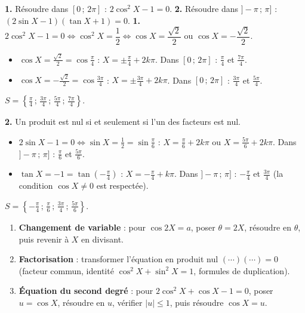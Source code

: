 \documentclass[11pt]{article}
\begin{document}
\begin{exoresolu}
\textbf{1.} Résoudre dans $[0\,;\,2\pi]$ : $2\cos^2 X - 1 = 0$.
\textbf{2.} Résoudre dans $]-\pi\,;\,\pi]$ : $(2\sin X - 1)(\tan X + 1) = 0$.
\tcblower
\textbf{1.} $2\cos^2 X - 1 = 0 \iff \cos^2 X = \dfrac12 \iff \cos X = \dfrac{\sqrt2}{2}$ ou $\cos X = -\dfrac{\sqrt2}{2}$.
\begin{itemize}
\item $\cos X = \frac{\sqrt2}{2} = \cos\frac{\pi}{4}$ : $X = \pm\frac{\pi}{4} + 2k\pi$. Dans $[0\,;\,2\pi]$ : $\frac{\pi}{4}$ et $\frac{7\pi}{4}$.
\item $\cos X = -\frac{\sqrt2}{2} = \cos\frac{3\pi}{4}$ : $X = \pm\frac{3\pi}{4} + 2k\pi$. Dans $[0\,;\,2\pi]$ : $\frac{3\pi}{4}$ et $\frac{5\pi}{4}$.
\end{itemize}
$S = \left\lbrace \frac{\pi}{4}\,;\,\frac{3\pi}{4}\,;\,\frac{5\pi}{4}\,;\,\frac{7\pi}{4} \right\rbrace$.

\textbf{2.} Un produit est nul si et seulement si l'un des facteurs est nul.
\begin{itemize}
\item $2\sin X - 1 = 0 \iff \sin X = \frac12 = \sin\frac{\pi}{6}$ : $X = \frac{\pi}{6} + 2k\pi$ ou $X = \frac{5\pi}{6} + 2k\pi$. Dans $]-\pi\,;\,\pi]$ : $\frac{\pi}{6}$ et $\frac{5\pi}{6}$.
\item $\tan X = -1 = \tan\left(-\frac{\pi}{4}\right)$ : $X = -\frac{\pi}{4} + k\pi$. Dans $]-\pi\,;\,\pi]$ : $-\frac{\pi}{4}$ et $\frac{3\pi}{4}$ (la condition $\cos X \neq 0$ est respectée).
\end{itemize}
$S = \left\lbrace -\frac{\pi}{4}\,;\,\frac{\pi}{6}\,;\,\frac{3\pi}{4}\,;\,\frac{5\pi}{6} \right\rbrace$.
\end{exoresolu}

\begin{methode}
\begin{enumerate}
\item \textbf{Changement de variable} : pour $\cos 2X = a$, poser $\theta = 2X$, résoudre en $\theta$, puis revenir à $X$ en divisant.
\item \textbf{Factorisation} : transformer l'équation en produit nul $(\cdots)(\cdots) = 0$ (facteur commun, identité $\cos^2 X + \sin^2 X = 1$, formules de duplication).
\item \textbf{Équation du second degré} : pour $2\cos^2 X + \cos X - 1 = 0$, poser $u = \cos X$, résoudre en $u$, vérifier $|u| \le 1$, puis résoudre $\cos X = u$.
\end{enumerate}
\end{methode}
\end{document}

